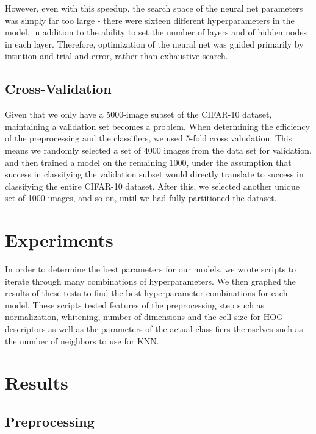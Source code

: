 \documentclass{article} %
\begin{document}

However, even with this speedup, the search space of the neural net parameters was simply far too large - there were sixteen different hyperparameters in the model, in addition to the ability to set the number of layers and of hidden nodes in each layer. Therefore, optimization of the neural net was guided primarily by intuition and trial-and-error, rather than exhaustive search.

\subsection*{Cross-Validation}

Given that we only have a 5000-image subset of the CIFAR-10 dataset, maintaining a validation set becomes a problem. When determining the efficiency of the preprocessing and the classifiers, we used 5-fold cross valudation. This means we randomly selected a set of 4000 images from the data set for validation, and then trained a model on the remaining $1000$, under the assumption that success in classifying the validation subset would directly translate to success in classifying the entire CIFAR-10 dataset. After this, we selected another unique set of 1000 images, and so on, until we had fully partitioned the dataset.

\section{Experiments}

In order to determine the best parameters for our models, we wrote scripts to iterate through many combinations of hyperparameters. We then graphed the results of these tests to find the best hyperparameter combinations for each model. These scripts tested features of the preprocessing step such as normalization, whitening, number of dimensions and the cell size for HOG descriptors as well as the parameters of the actual classifiers themselves such as the number of neighbors to use for KNN.

\section{Results}

\subsection*{Preprocessing}
\end{document}
